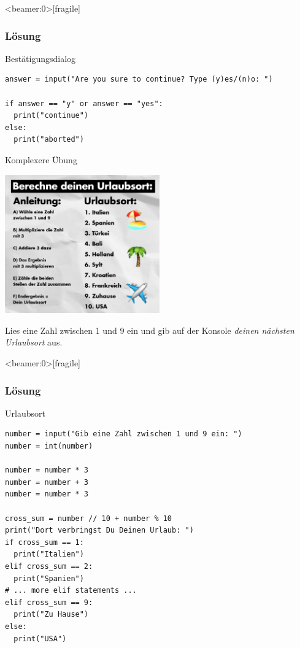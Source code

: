 \begin{frame}<beamer:0>[fragile]
\frametitle{Lösung}
\begin{solutionblock}{Bestätigungsdialog}
\begin{verbatim}
answer = input("Are you sure to continue? Type (y)es/(n)o: ")

if answer == "y" or answer == "yes":
  print("continue")
else:
  print("aborted")
\end{verbatim}
\end{solutionblock}
\end{frame}

\begin{frame}{Komplexere Übung}
\begin{center}
\includegraphics[width=0.5\textwidth]{urlaubsort.png}
\end{center}
Lies eine Zahl zwischen 1 und 9 ein und gib auf der Konsole \emph{deinen nächsten Urlaubsort} aus. 
\end{frame}


\begin{frame}<beamer:0>[fragile]
\frametitle{Lösung}
\begin{solutionblock}{Urlaubsort}
\begin{verbatim}
number = input("Gib eine Zahl zwischen 1 und 9 ein: ")
number = int(number)

number = number * 3
number = number + 3
number = number * 3

cross_sum = number // 10 + number % 10
print("Dort verbringst Du Deinen Urlaub: ")
if cross_sum == 1:
  print("Italien")
elif cross_sum == 2:
  print("Spanien")
# ... more elif statements ... 
elif cross_sum == 9:
  print("Zu Hause")
else:
  print("USA")
\end{verbatim}
\end{solutionblock}
\end{frame}



